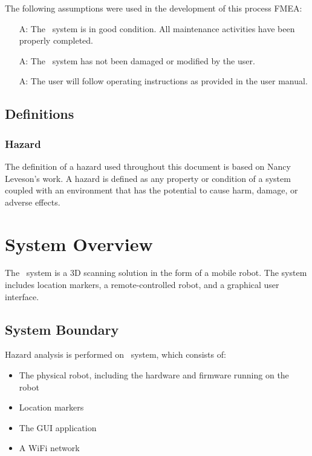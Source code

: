 \documentclass[12pt]{article}
\newcounter{assumpnum} %
\begin{document}
The following assumptions were used in the development of this process FMEA:

\noindent \begin{itemize}
\item[A\refstepcounter{assumpnum}\theassumpnum \label{Assumption1}:] The \progname ~system is in good condition. All maintenance activities have been properly completed. 

\item[A\refstepcounter{assumpnum}\theassumpnum \label{Assumption2}:]The \progname ~system has not been damaged or modified by the user.

\item[A\refstepcounter{assumpnum}\theassumpnum \label{Assumption3}:] The user will follow operating instructions as provided in the user manual.

\end{itemize}

\subsection{Definitions}

\subsubsection{Hazard}

The definition of a hazard used throughout this document is based on  Nancy Leveson's work. A hazard is defined as any property or condition of a system coupled with an environment that has the potential to cause harm, damage, or adverse effects.

\section{System Overview}

The \progname ~system is a 3D scanning solution in the form of a mobile robot. The system includes location markers, a remote-controlled robot, and a graphical user interface.

\subsection{System Boundary}

Hazard analysis is performed on \progname ~system, which consists of: 

\begin{itemize}
\item The physical robot, including the hardware and firmware running on the robot
\item Location markers
\item The GUI application
\item A WiFi network
\end{itemize}
\end{document}
